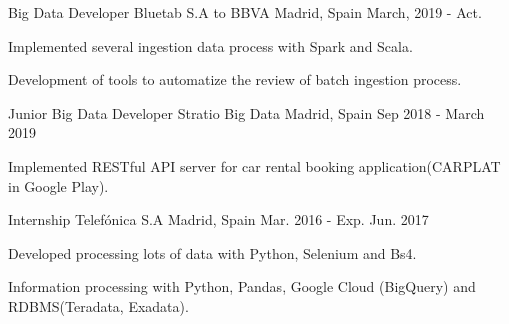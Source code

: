 

\begin{cventries}

  \cventry
    {Big Data Developer} %
    {Bluetab S.A to BBVA} %
    {Madrid, Spain} %
    {March, 2019 - Act.} %
    {
      \begin{cvitems} %
        \item {Implemented several ingestion data process with Spark and Scala.}
        \item {Development of tools to automatize the review of batch ingestion process.}
      \end{cvitems}
    }

  \cventry
    {Junior Big Data Developer} %
    {Stratio Big Data} %
    {Madrid, Spain} %
    {Sep 2018 - March 2019} %
    {
      \begin{cvitems} %
        \item {Implemented RESTful API server for car rental booking application(CARPLAT in Google Play).}
      \end{cvitems}
    }

  \cventry
    {Internship} %
    {Telefónica S.A} %
    {Madrid, Spain} %
    {Mar. 2016 - Exp. Jun. 2017} %
    {
      \begin{cvitems} %
        \item {Developed processing lots of data with Python, Selenium and Bs4.}
        \item {Information processing with Python, Pandas, Google Cloud (BigQuery) and RDBMS(Teradata, Exadata).}
      \end{cvitems}
    }

\end{cventries}

